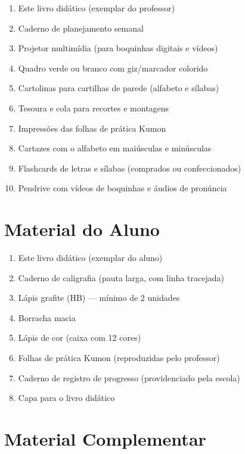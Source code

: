 \begin{enumerate}[leftmargin=2cm]
  \item Este livro did\'{a}tico (exemplar do professor)
  \item Caderno de planejamento semanal
  \item Projetor multim\'{i}dia (para boquinhas digitais e v\'{i}deos)
  \item Quadro verde ou branco com giz/marcador colorido
  \item Cartolinas para cartilhas de parede (alfabeto e s\'{i}labas)
  \item Tesoura e cola para recortes e montagens
  \item Impress\~{o}es das folhas de pr\'{a}tica Kumon
  \item Cartazes com o alfabeto em mai\'{u}sculas e min\'{u}sculas
  \item Flashcards de letras e s\'{i}labas (comprados ou confeccionados)
  \item Pendrive com v\'{i}deos de boquinhas e \'{a}udios de pron\'{u}ncia
\end{enumerate}

\section{Material do Aluno}

\begin{enumerate}[leftmargin=2cm]
  \item Este livro did\'{a}tico (exemplar do aluno)
  \item Caderno de caligrafia (pauta larga, com linha tracejada)
  \item L\'{a}pis grafite (HB) — m\'{i}nimo de 2 unidades
  \item Borracha macia
  \item L\'{a}pis de cor (caixa com 12 cores)
  \item Folhas de pr\'{a}tica Kumon (reproduzidas pelo professor)
  \item Caderno de registro de progresso (providenciado pela escola)
  \item Capa para o livro did\'{a}tico
\end{enumerate}

\section{Material Complementar}

